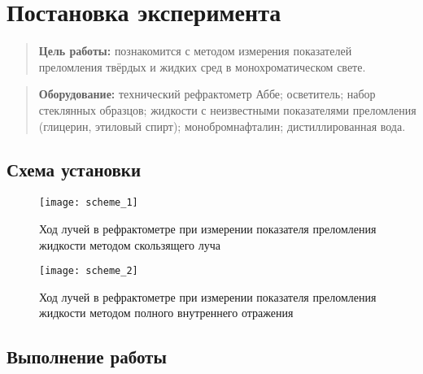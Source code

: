 \documentclass{lab}
\begin{document}

\section*{Постановка эксперимента}

\begin{quote}
	\textbf{{\normalsize Цель работы: }}
	познакомится с методом измерения показателей преломления твёрдых и жидких сред в монохроматическом свете.
\end{quote}

\begin{quote}
	\textbf{{\normalsize Оборудование: }}
	технический рефрактометр Аббе; осветитель; набор стеклянных образцов;
	жидкости с неизвестными показателями преломления (глицерин, этиловый спирт);
	монобромнафталин; дистиллированная вода.
\end{quote}

\subsection*{Схема установки}

\begin{figure}[H]
	\centering
	\texttt{[image: scheme\_1]}
	\caption{Ход лучей в рефрактометре при измерении показателя преломления жидкости методом скользящего луча}
	\label{scheme_1}
\end{figure}

\begin{figure}[H]
	\centering
	\texttt{[image: scheme\_2]}
	\caption{Ход лучей в рефрактометре при измерении показателя преломления жидкости методом полного внутреннего отражения}
	\label{scheme_2}
\end{figure}

\subsection*{Выполнение работы}
\end{document}
